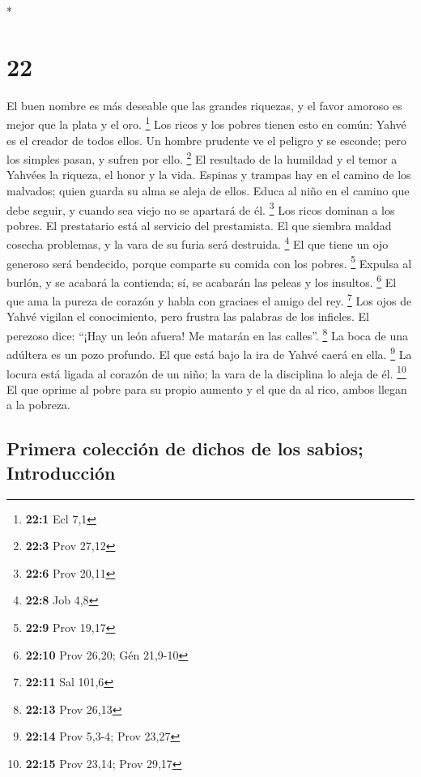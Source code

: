\begin{paracol}{2}
\begin{otherlanguage}{english}
\end{otherlanguage}

\switchcolumn[0]*

\hypertarget{section-42}{%
\section{22}\label{section-42}}

 El buen nombre es más deseable que las grandes riquezas,
y el favor amoroso es mejor que la plata y el oro. \footnote{\textbf{22:1}
  Ecl 7,1}  Los ricos y los pobres tienen esto en común:
Yahvé es el creador de todos ellos.  Un hombre prudente ve
el peligro y se esconde; pero los simples pasan, y sufren por ello.
\footnote{\textbf{22:3} Prov 27,12}  El resultado de la
humildad y el temor a Yahvées la riqueza, el honor y la vida.
 Espinas y trampas hay en el camino de los malvados; quien
guarda su alma se aleja de ellos.  Educa al niño en el
camino que debe seguir, y cuando sea viejo no se apartará de él.
\footnote{\textbf{22:6} Prov 20,11}  Los ricos dominan a
los pobres. El prestatario está al servicio del prestamista.
 El que siembra maldad cosecha problemas, y la vara de su
furia será destruida. \footnote{\textbf{22:8} Job 4,8}  El
que tiene un ojo generoso será bendecido, porque comparte su comida con
los pobres. \footnote{\textbf{22:9} Prov 19,17}  Expulsa
al burlón, y se acabará la contienda; sí, se acabarán las peleas y los
insultos. \footnote{\textbf{22:10} Prov 26,20; Gén 21,9-10}
 El que ama la pureza de corazón y habla con graciaes el
amigo del rey. \footnote{\textbf{22:11} Sal 101,6}  Los
ojos de Yahvé vigilan el conocimiento, pero frustra las palabras de los
infieles.  El perezoso dice: ``¡Hay un león afuera! Me
matarán en las calles''. \footnote{\textbf{22:13} Prov 26,13}
 La boca de una adúltera es un pozo profundo. El que está
bajo la ira de Yahvé caerá en ella. \footnote{\textbf{22:14} Prov 5,3-4;
  Prov 23,27}  La locura está ligada al corazón de un
niño; la vara de la disciplina lo aleja de él. \footnote{\textbf{22:15}
  Prov 23,14; Prov 29,17}  El que oprime al pobre para su
propio aumento y el que da al rico, ambos llegan a la pobreza.

\hypertarget{primera-colecciuxf3n-de-dichos-de-los-sabios-introducciuxf3n}{%
\subsection{Primera colección de dichos de los sabios;
Introducción}\label{primera-colecciuxf3n-de-dichos-de-los-sabios-introducciuxf3n}}


\end{paracol}
